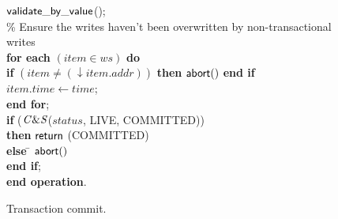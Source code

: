 \begin{figure} [htb]
{{\begin{minipage}[t]{150mm}
\begin{tabbing}
 \> ${\sf validate\_by\_value}$(); \\


\> \% Ensure the writes haven't been overwritten by non-transactional writes \\
 \> 
{\bf for each} $(\mathit{item} \in \mathit{ws})$ {\bf do} \\

 \>\> {\bf if} $(\mathit{item} \neq (\downarrow \mathit{item.addr}))$  
                 {\bf then} 
                   ${\sf abort}()$ 
                {\bf end if} \\
 \>\> $\mathit{item.time} \gets \mathit{time}$; \\
 \> {\bf end for}; \\
 \> {\bf if} (${\sf \mathit{C\&S}}$($\mathit{status}$, LIVE, COMMITTED)) \\
 \>\> {\bf then} \> ${\sf return}$ (COMMITTED)\\
 \> \> {\bf else} \= ${\sf abort}()$ \\
 \> {\bf end if};  \\
{\bf end operation}.

\end{tabbing}
\normalsize
\end{minipage}
}
\caption{Transaction commit.}
\label{fig:tbc2}
}
\end{figure}



